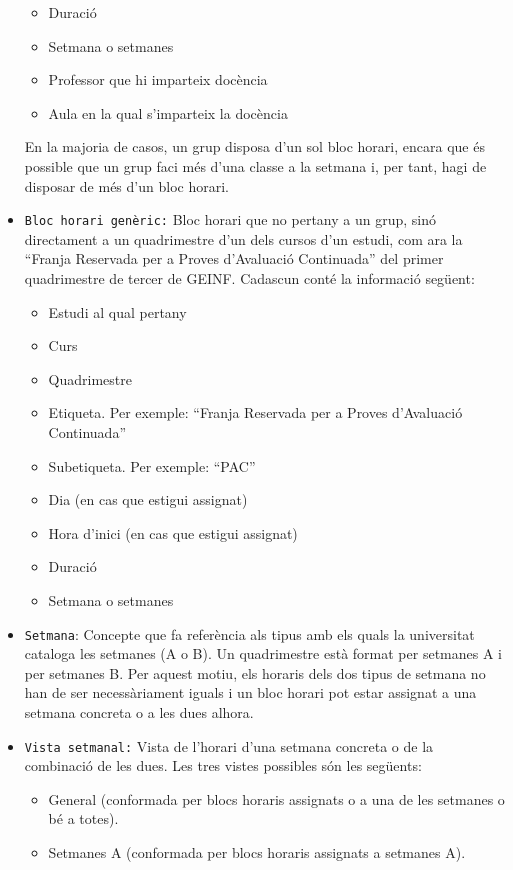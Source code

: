 \documentclass[a4paper,12pt]{ThesisStyle}
\begin{document}
\begin{itemize}
\begin{itemize}
    \item Duració
    \item Setmana o setmanes
    \item Professor que hi imparteix docència
    \item Aula en la qual s'imparteix la docència
  \end{itemize}
  En la majoria de casos, un grup disposa d'un sol bloc horari, encara que és possible que un grup faci més d'una classe a la setmana i, per tant, hagi de disposar de més d'un bloc horari. 
  \item \texttt{Bloc horari genèric:} Bloc horari que no pertany a un grup, sinó directament a un quadrimestre d'un dels cursos d'un estudi, com ara la ``Franja Reservada per a Proves d'Avaluació Continuada'' del primer quadrimestre de tercer de GEINF. Cadascun conté la informació següent:
  \begin{itemize}
    \item Estudi al qual pertany
    \item Curs
    \item Quadrimestre
    \item Etiqueta. Per exemple: ``Franja Reservada per a Proves d'Avaluació Continuada''
    \item Subetiqueta. Per exemple: ``PAC''
    \item Dia (en cas que estigui assignat)
    \item Hora d'inici (en cas que estigui assignat)
    \item Duració
    \item Setmana o setmanes
  \end{itemize}
  \item \texttt{Setmana}: Concepte que fa referència als tipus amb els quals la universitat cataloga les setmanes (A o B). Un quadrimestre està format per setmanes A i per setmanes B. Per aquest motiu, els horaris dels dos tipus de setmana no han de ser necessàriament iguals i un bloc horari pot estar assignat a una setmana concreta o a les dues alhora.
  \item \texttt{Vista setmanal:} Vista de l'horari d'una setmana concreta o de la combinació de les dues. Les tres vistes possibles són les següents:
  \begin{itemize}
    \item General (conformada per blocs horaris assignats o a una de les setmanes o bé a totes).
    \item Setmanes A (conformada per blocs horaris assignats a setmanes A).

\end{itemize}
\end{itemize}
\end{document}
